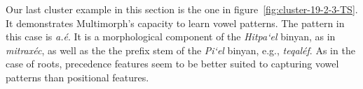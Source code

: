 Our last cluster example in this section is the one in figure~\ref{fig:cluster-19-2-3-TS}. It demonstrates 
Multimorph's capacity to learn vowel patterns. The pattern in this case is \textit{a.\'{e}}.
 It is a morphological component of the \textit{Hitpa`el} binyan, 
as in \textit{mitrax\'{e}c}, as well as the 
the prefix stem of the \textit{Pi`el} binyan,
e.g., \textit{teqal\'{e}f}.
As in the case of roots, precedence features seem to be better suited to capturing vowel patterns than positional features.



% 

